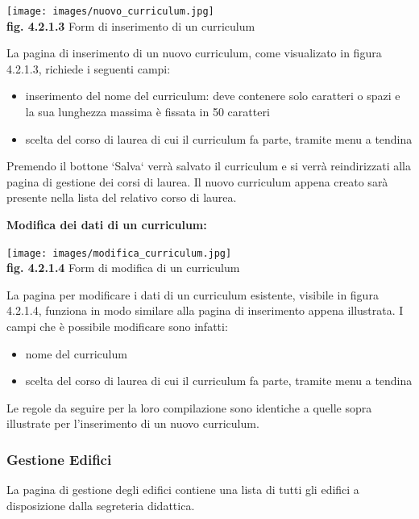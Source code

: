 \documentclass[11pt,a4paper]{article}
\begin{document}
\begin{center}
	\texttt{[image: images/nuovo\_curriculum.jpg]}\\
	\textbf{fig. 4.2.1.3} Form di inserimento di un curriculum\\
\end{center}

La pagina di inserimento di un nuovo curriculum, come visualizato in figura 4.2.1.3, richiede i seguenti campi:
\begin{itemize}
 \item inserimento del nome del curriculum: deve contenere solo caratteri o spazi e la sua lunghezza massima è fissata in 50 caratteri
 \item scelta del corso di laurea di cui il curriculum fa parte, tramite menu a tendina
\end{itemize}
Premendo il bottone `Salva` verrà salvato il curriculum e si verrà reindirizzati alla pagina di gestione dei corsi di laurea. Il nuovo curriculum appena creato sarà presente nella lista del relativo corso di laurea.
\newline \newline
\begin{large}\textbf{Modifica dei dati di un curriculum:}\end{large}

\begin{center}
	\texttt{[image: images/modifica\_curriculum.jpg]}\\
	\textbf{fig. 4.2.1.4} Form di modifica di un curriculum\\
\end{center}

La pagina per modificare i dati di un curriculum esistente, visibile in figura 4.2.1.4, funziona in modo similare alla pagina di inserimento appena illustrata. I campi che è possibile modificare sono infatti:
\begin{itemize}
 \item nome del curriculum
 \item scelta del corso di laurea di cui il curriculum fa parte, tramite menu a tendina
\end{itemize}
Le regole da seguire per la loro compilazione sono identiche a quelle sopra illustrate per l'inserimento di un nuovo curriculum.
\subsubsection{Gestione Edifici}
La pagina di gestione degli edifici contiene una lista di tutti gli edifici a disposizione dalla segreteria didattica.
\end{document}
